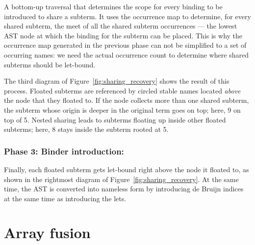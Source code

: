 A bottom-up traversal that determines the scope for every binding to be
introduced to share a subterm. It uses the occurrence map to determine, for
every shared subterm, the meet of all the shared subterm occurrences --- the
lowest AST node at which the binding for the subterm can be placed. This is why
the occurrence map generated in the previous phase can not be simplified to a
set of occurring names: we need the actual occurrence count to determine where
shared subterms should be let-bound.

The third diagram of Figure~\ref{fig:sharing_recovery} shows the result of this
process. Floated subterms are referenced by circled stable names located
\emph{above} the node that they floated to. If the node collects more than one
shared subterm, the subterm whose origin is deeper in the original term goes on
top; here, 9 on top of 5. Nested sharing leads to subterms floating up inside
other floated subterms; here, 8 stays inside the subterm rooted at 5.


\subsubsection*{Phase 3: Binder introduction:}

Finally, each floated subterm gets let-bound right above the node it floated to,
as shown in the rightmost diagram of Figure~\ref{fig:sharing_recovery}. At the
same time, the AST is converted into nameless  form by
introducing de Bruijn indices at the same time as introducing the lets.


\section{Array fusion}
\label{sec:array_fusion}

